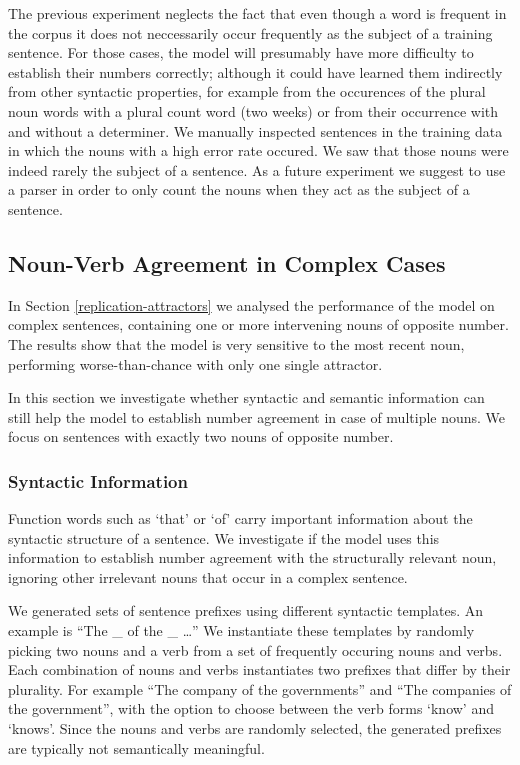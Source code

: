     
The previous experiment neglects the fact that even though a word is frequent in the corpus 
it does not neccessarily occur frequently as the subject of a training sentence. 
For those cases, the model will presumably 
have more difficulty to establish their numbers correctly;
although it could have learned them indirectly from other syntactic
properties, for example from the occurences of the plural noun words
with a plural count word (two weeks) or from their occurrence 
with and without a determiner.
We manually inspected sentences in the training data in which
the nouns with a high error rate occured. We saw that those nouns were 
indeed rarely the subject of a sentence. As a future experiment we suggest 
to use a parser in order to only count the nouns when 
they act as the subject of a sentence. 

\subsection{Noun-Verb Agreement in Complex Cases}

In Section \ref{replication-attractors} we analysed the performance of the model
on complex sentences, containing one or more 
intervening nouns of opposite number.
The results show that the model is very
sensitive to the most recent noun,
performing worse-than-chance with only one single attractor.

In this section we investigate whether
syntactic and semantic information
can still help the model 
to establish number agreement
in case of multiple nouns.
We focus on sentences with exactly two nouns
of opposite number.


\subsubsection{Syntactic Information}

Function words such as `that' or `of' carry 
important information about the syntactic structure of a sentence.
We investigate if the model
uses this information to establish number agreement
with the structurally relevant noun, ignoring
other irrelevant nouns that occur in a complex sentence.

We generated sets of sentence prefixes using 
different syntactic templates.
An example is ``The \_ of the \_ \ldots''
We instantiate these templates by randomly
picking two nouns and a verb 
from a set of frequently occuring nouns and verbs. 
Each combination of nouns and verbs instantiates
two prefixes that differ by their plurality.
For example ``The company of the governments''
and ``The companies of the government'',
with the option to choose between the verb forms
`know' and `knows'.
Since the nouns and verbs are randomly selected,
the generated prefixes 
are typically not semantically
meaningful.

